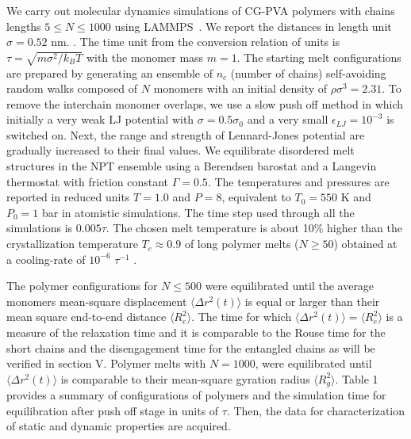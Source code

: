 \documentclass[pre,showpacs,notitlepage,twocolumn]{revtex4-1}
\begin{document}
We carry out  molecular dynamics simulations of CG-PVA polymers  with chains lengths $5 \le N \le 1000$ using LAMMPS~\cite{LAMMPS}.   We report the distances in length unit $\sigma=0.52$ nm.  \cite{Meyer2001}.  The time unit from 
the conversion relation  of units   is $\tau=\sqrt{m \sigma^2/k_B T} $ with the monomer mass $m=1$.
The starting melt configurations are  prepared by generating an ensemble of  $n_c$ (number of chains) self-avoiding random walks composed of  $N$ monomers  with an initial density of $\rho \sigma^3=2.31$.  To remove 
the interchain monomer overlaps, we use a slow push off method in which initially  a very weak LJ potential with $\sigma=0.5 \sigma_0$ and a very small $\epsilon_{LJ}=10^{-3}$ is switched on. Next, the range and strength of Lennard-Jones potential are gradually  increased  to their final values.   
We equilibrate  disordered melt structures in the NPT ensemble using a Berendsen barostat  and  a Langevin thermostat
with friction constant $\Gamma=0.5$. The temperatures and pressures are reported in  reduced units  $T=1.0$ and $P=8$,  equivalent to $T_0=550$ K  and  $P_0=1$ bar in atomistic simulations. The time step  used through all the simulations is $0.005 \tau$. The chosen melt temperature is about 10\% higher than the crystallization temperature $T_c\approx 0.9$ of long   polymer melts  ($N \ge 50$) obtained at a cooling-rate of $10^{-6}$ $\tau^{-1}$ \cite{SaraPRL2017}.


The polymer configurations for $N \le 500$ were equilibrated until the average  monomers mean-square  displacement
$\langle \Delta r^2(t) \rangle$ is equal  or larger than their mean square end-to-end distance $\langle R_e^2 \rangle$. The time for which $\langle \Delta r^2(t) \rangle=\langle R_e^2 \rangle$ is a measure of the relaxation 
time   and it is comparable to the Rouse 
time for the short chains and the disengagement time for the entangled chains \cite{polymerDoi} as will be verified in section V. Polymer melts with $N=1000$,  were equilibrated until $\langle \Delta r^2(t) \rangle$
is comparable to their mean-square gyration radius $\langle R_g^2 \rangle$.  Table 1 provides a summary of configurations of polymers and the simulation time for equilibration  after push off stage  in units of $\tau$. Then, the  data for characterization
of   static  and dynamic properties are acquired. 
 
\end{document}
